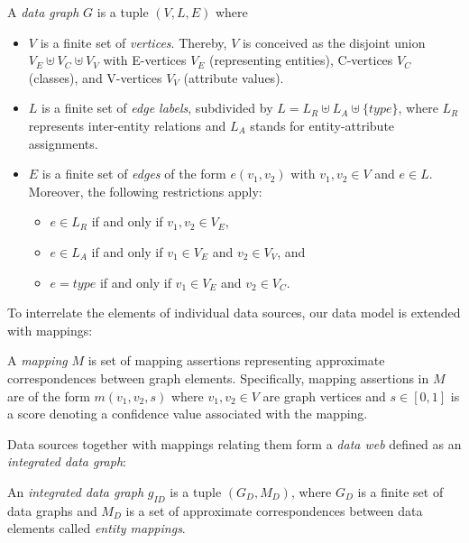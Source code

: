 \begin{definition}\label{def:datagraph}
A \emph{data graph} $G$ is a tuple $(V,L,E)$ where
\begin{itemize}
  \item $V$ is a finite set of \emph{vertices}. Thereby, $V$ is
  conceived as the disjoint union $V_E\uplus
  V_C\uplus V_V$ with E-vertices $V_E$
  (representing entities), C-vertices $V_C$
  (classes), and V-vertices $V_V$ (attribute values).
  \item $L$ is a finite set of \emph{edge
  labels}, subdivided by $L = L_R \uplus L_A \uplus
  \{type\}$, where $L_R$ represents
  inter-entity relations and $L_A$ stands for
  entity-attribute assignments. \item $E$ is a
  finite set of \emph{edges} of the form
  $e(v_1,v_2)$ with $v_1,v_2\in V$ and $e\in L$.
  Moreover, the following restrictions apply:
  \begin{itemize}
    \item $e \in L_R$ if and only if $v_1, v_2 \in V_E$,
    \item $e \in L_A$ if and only if $v_1 \in V_E$ and $v_2 \in V_V$, and
    \item $e = \mathit{type}$ if and only if $v_1 \in V_E$ and $v_2 \in V_C$. 
  \end{itemize}
\end{itemize}
\end{definition}

To interrelate the elements of individual data sources, our data model is extended with mappings:

\begin{definition} A \emph{mapping} $M$ is set of mapping assertions representing approximate
correspondences between graph elements. Specifically, mapping assertions in $M$ are of the form
$m(v_1,v_2, s)$ where $v_1,v_2 \in V$ are graph vertices  and $s \in [0,1]$ is a score denoting a
confidence value associated with the mapping.
\end{definition}

Data sources together with mappings relating them form a \emph{data web} defined as an {\em
integrated data graph}:

\begin{definition}\label{def:idatagraph} An \emph{integrated data graph} $g_{ID}$ is a tuple
$(G_D,M_D)$, where $G_D$ is a finite set of data graphs and $M_D$ is a set of approximate
correspondences between data elements called \emph{entity mappings}.
\end{definition}

